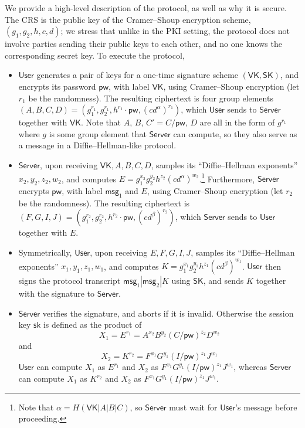 \documentclass[12pt,a4paper]{article}
\newcommand{\user}{\mathsf{User}}
\newcommand{\sk}{\mathsf{sk}}
\newcommand{\pw}{\mathsf{pw}}
\newcommand{\VK}{\mathsf{VK}}
\newcommand{\SK}{\mathsf{SK}}
\newcommand{\server}{\mathsf{Server}}
\newcommand{\msg}[1]{\mathsf{msg}_{#1}}
\begin{document}
We provide a high-level description of the protocol, as well as why it is secure. The CRS is the public key of the Cramer--Shoup encryption scheme, $(g_1, g_2, h, c, d)$; we stress that unlike in the PKI setting, the protocol does not involve parties sending their public keys to each other, and no one knows the corresponding secret key. To execute the protocol,
\begin{itemize}
  \item $\user$ generates a pair of keys for a one-time signature scheme $(\VK,\SK)$, and encrypts its password $\pw$, with label $\VK$, using Cramer--Shoup encryption (let $r_1$ be the randomness). The resulting ciphertext is four group elements $(A,B,C,D) = (g_1^{r_1}, g_2^{r_1}, h^{r_1} \cdot\pw, (cd^\alpha)^{r_1})$, which $\user$ sends to $\server$ together with $\VK$. Note that $A$, $B$, $C' = C/\pw$, $D$ are all in the form of $g^{r_1}$ where $g$ is some group element that $\server$ can compute, so they also serve as a message in a Diffie--Hellman-like protocol.
  \item $\server$, upon receiving $\VK,A,B,C,D$, samples its ``Diffie--Hellman exponents'' $x_2,y_2,z_2,w_2$, and computes $E = g_1^{x_2}g_2^{y_2}h^{z_2}(cd^\alpha)^{w_2}$.\footnote{Note that $\alpha = H(\VK|A|B|C)$, so $\server$ must wait for $\user$'s message before proceeding.} Furthermore, $\server$ encrypts $\pw$, with label $\msg{1}$ and $E$, using Cramer--Shoup encryption (let $r_2$ be the randomness). The resulting ciphertext is $(F,G,I,J) = (g_1^{r_2}, g_2^{r_2}, h^{r_2} \cdot\pw, (cd^\beta)^{r_2})$, which $\server$ sends to $\user$ together with $E$.
  \item Symmetrically, $\user$, upon receiving $E,F,G,I,J$, samples its ``Diffie--Hellman exponents'' $x_1,y_1,z_1,w_1$, and computes $K = g_1^{x_1}g_2^{y_1}h^{z_1}(cd^\beta)^{w_1}$. $\user$ then signs the protocol transcript $\msg{1}|\msg{2}|K$ using $\SK$, and sends $K$ together with the signature to $\server$.
  \item $\server$ verifies the signature, and aborts if it is invalid. Otherwise the session key $\sk$ is defined as the product of
      \[
      X_1 = E^{r_1} = A^{x_2}B^{y_2}(C/\pw)^{z_2}D^{w_2}
      \]
      and
      \[
      X_2 = K^{r_2} = F^{x_1}G^{y_1}(I/\pw)^{z_1}J^{w_1}
      \]
      $\user$ can compute $X_1$ as $E^{r_1}$ and $X_2$ as $F^{x_1}G^{y_1}(I/\pw)^{z_1}J^{w_1}$, whereas $\server$ can compute $X_1$ as $K^{r_2}$ and $X_2$ as $F^{x_1}G^{y_1}(I/\pw)^{z_1}J^{w_1}$.
\end{itemize}
\end{document}
